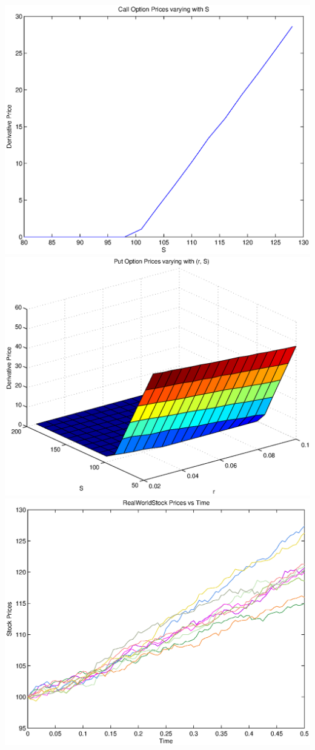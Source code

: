 \documentclass{article}
\begin{document}
\includegraphics[width=\textwidth]{Call_Option_Prices_varying_with_S}
\includegraphics[width=\textwidth]{Put_Option_Prices_varying_with_(r,_S)}
\includegraphics[width=\textwidth]{RealWorld_Stock_Prices_vs_Time}
\end{document}
